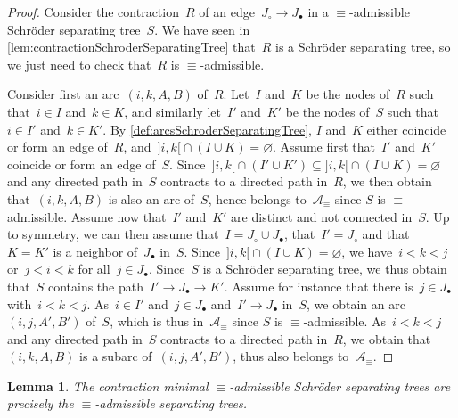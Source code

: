 \documentclass{amsart}
\newtheorem{lemma}[theorem]{Lemma}
\theoremstyle{definition}
\newcommand{\vincent}[1]{\todo[color=blue!30]{#1 \\ \hfill --- V.}}
\newcommand{\arcs}{{\mathcal{A}}} %
\begin{document}
\begin{proof}
Consider the contraction~$R$ of an edge~$J_\circ \to J_\bullet$ in a $\equiv$-admissible Schröder separating tree~$S$.
We have seen in \cref{lem:contractionSchroderSeparatingTree} that~$R$ is a Schröder separating tree, so we just need to check that~$R$ is $\equiv$-admissible.

Consider first an arc~$(i,k,A,B)$ of~$R$.
Let~$I$ and~$K$ be the nodes of~$R$ such that~$i \in I$ and~$k \in K$, and similarly let~$I'$ and~$K'$ be the nodes of~$S$ such that~$i \in I'$ and~$k \in K'$.
By \cref{def:arcsSchroderSeparatingTree}, $I$ and~$K$ either coincide or form an edge of~$R$, and~${]i,k[} \cap (I \cup K) = \varnothing$.
Assume first that~$I'$ and~$K'$ coincide or form an edge of~$S$.
Since~${]i,k[} \cap (I' \cup K') \subseteq {]i,k[} \cap (I \cup K) = \varnothing$ and any directed path in~$S$ contracts to a directed path in~$R$, we then obtain that~$(i,k,A,B)$ is also an arc of~$S$, hence belongs to~$\arcs_\equiv$ since $S$ is $\equiv$-admissible.
Assume now that~$I'$ and~$K'$ are distinct and not connected in~$S$.
Up to symmetry, we can then assume that~$I = J_\circ \cup J_\bullet$, that~$I' = J_\circ$ and that~$K = K'$ is a neighbor of~$J_\bullet$ in~$S$.
Since~${]i,k[} \cap (I \cup K) = \varnothing$, we have~$i < k < j$ or~$j < i < k$  for all~$j \in J_\bullet$.
Since~$S$ is a Schröder separating tree, we thus obtain that~$S$ contains the path~$I' \to J_\bullet \to K'$.
Assume for instance that there is~$j \in J_\bullet$ with~$i < k < j$.
As~$i \in I'$ and~$j \in J_\bullet$ and~$I' \to J_\bullet$ in~$S$, we obtain an arc~$(i, j, A', B')$ of~$S$, which is thus in~$\arcs_\equiv$ since $S$ is $\equiv$-admissible.
As~$i < k < j$ and any directed path in~$S$ contracts to a directed path in~$R$, we obtain that~$(i,k,A,B)$ is a subarc of~$(i,j,A',B')$, thus also belongs to~$\arcs_\equiv$.

\vincent{todo}
\end{proof}

\begin{lemma}
\label{lem:decontractionAdmissibleSchroderSeparatingTree}
The contraction minimal $\equiv$-admissible Schröder separating trees are precisely the $\equiv$-admissible separating trees.
\end{lemma}
\end{document}
